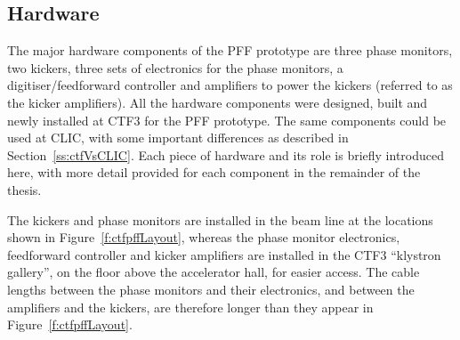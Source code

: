 
\subsection{Hardware}
\label{ss:ctfPFFHardware}

The major hardware components of the PFF prototype are three phase monitors, two kickers, three sets of electronics for the phase monitors, a digitiser/feedforward controller and amplifiers to power the kickers (referred to as the kicker amplifiers). All the hardware components were designed, built and newly installed at CTF3 for the PFF prototype. The same components could be used at CLIC, with some important differences as described in Section~\ref{ss:ctfVsCLIC}. Each piece of hardware and its role is briefly introduced here, with more detail provided for each component in the remainder of the thesis.

The kickers and phase monitors are installed in the beam line at the locations shown in Figure~\ref{f:ctfpffLayout}, whereas the phase monitor electronics, feedforward controller and kicker amplifiers are installed in the CTF3 ``klystron gallery'', on the floor above the accelerator hall, for easier access. The cable lengths between the phase monitors and their electronics, and between the amplifiers and the kickers, are therefore longer than they appear in Figure~\ref{f:ctfpffLayout}.

